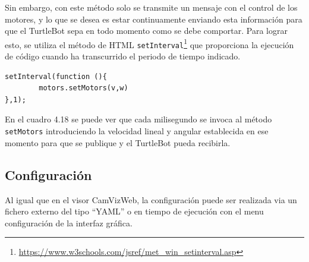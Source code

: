 Sin embargo, con este método solo se transmite un mensaje con el control de los motores, y lo que se desea es estar continuamente enviando esta información para que el TurtleBot sepa en todo momento como se debe comportar. Para lograr esto, se utiliza el método de HTML \texttt{setInterval}\footnote{\url{https://www.w3schools.com/jsref/met_win_setinterval.asp}} que proporciona la ejecución de código cuando ha transcurrido el periodo de tiempo indicado.

\begin{lstlisting}[caption= Invocación cada milisegundo al método para publicar el mensaje con los motores, label=cod.setintervalTurtle]
setInterval(function (){
        motors.setMotors(v,w)
},1);
\end{lstlisting}

En el cuadro 4.18 se puede ver que cada milisegundo se invoca al método \texttt{setMotors} introduciendo la velocidad lineal y angular establecida en ese momento para que se publique y el TurtleBot pueda recibirla.

\subsection{Configuración}
Al igual que en el visor CamVizWeb, la configuración puede ser realizada via un fichero externo del tipo ``YAML'' o en tiempo de ejecución con el menu configuración de la interfaz gráfica.

